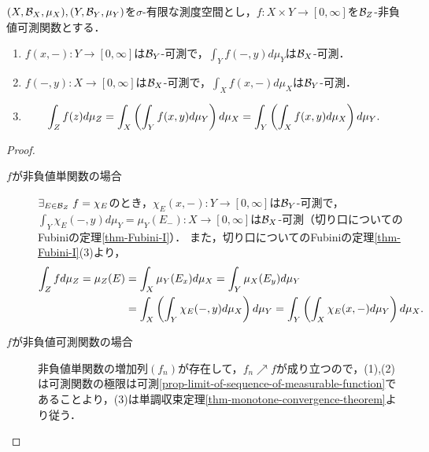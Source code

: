 \documentclass[uplatex, dvipdfmx]{jsreport}
\begin{document}
\begin{theorem}\label{thm-Fubini-II}
    $(X,\mathcal{B}_X,\mu_X),(Y,\mathcal{B}_Y,\mu_Y)$を$\sigma$-有限な測度空間とし，$f:X\times Y\to[0,\infty]$を$\mathcal{B}_Z$-非負値可測関数とする．
    \begin{enumerate}
        \item $f(x,-):Y\to[0,\infty]$は$\mathcal{B}_Y$-可測で，$\int_Yf(-,y)d\mu_Y$は$\mathcal{B}_X$-可測．
        \item $f(-,y):X\to[0,\infty]$は$\mathcal{B}_X$-可測で，$\int_Xf(x,-)d\mu_X$は$\mathcal{B}_Y$-可測．
        \item \[\int_{Z}f(z)d\mu_Z=\int_X\left(\int_Yf(x,y)d\mu_Y\right)d\mu_X=\int_Y\left(\int_Xf(x,y)d\mu_X\right)d\mu_Y.\]
    \end{enumerate}
\end{theorem}
\begin{proof}\mbox{}
    \begin{description}
        \item[$f$が非負値単関数の場合] $\exists_{E\in\mathcal{B}_Z}\;f=\chi_E$のとき，$\chi_E(x,-):Y\to[0,\infty]$は$\mathcal{B}_Y$-可測で，$\int_Y\chi_E(-,y)d\mu_Y=\mu_Y(E_-):X\to[0,\infty]$は$\mathcal{B}_X$-可測（切り口についてのFubiniの定理\ref{thm-Fubini-I}）．
        また，切り口についてのFubiniの定理\ref{thm-Fubini-I}(3)より，
        \begin{align*}
            \int_Zfd\mu_Z=\mu_Z(E)&=\int_X\mu_Y(E_x)d\mu_X=\int_Y\mu_X(E_y)d\mu_Y\\
            &=\int_X\left(\int_Y\chi_E(-,y)d\mu_X\right)d\mu_Y=\int_Y\left(\int_X\chi_E(x,-)d\mu_Y\right)d\mu_X.
        \end{align*}
        \item[$f$が非負値可測関数の場合] 
        非負値単関数の増加列$(f_n)$が存在して，$f_n\nearrow f$が成り立つので，(1),(2)は可測関数の極限は可測\ref{prop-limit-of-sequence-of-measurable-function}であることより，(3)は単調収束定理\ref{thm-monotone-convergence-theorem}より従う．
    \end{description}
\end{proof}
\end{document}
